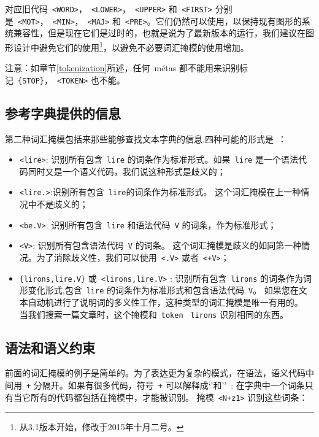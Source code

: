 \noindent  对应旧代码\ \verb+<WORD>+，\ \verb+<LOWER>+，\ \verb+<UPPER>+ 和\ \verb+<FIRST>+ 分别是\ \verb+<MOT>+，\ \verb+<MIN>+，\ \verb+<MAJ>+ 和\ \verb+<PRE>+。它们仍然可以使用，以保持现有图形的系统兼容性，但是现在它们是过时的，也就是说为了最新版本的运行，我们建议在图形设计中避免它们的使用\footnote{从3.1版本开始，修改于2015年十月二号。}，以避免不必要词汇掩模的使用增加。

\bigskip
\noindent 注意：如章节\ref{tokenization}所述，任何\ métas 都不能用来识别标记\ \verb+{STOP}+，\ \verb+<TOKEN>+ 也不能。

\subsection{参考字典提供的信息}

第二种词汇掩模包括来那些能够查找文本字典的信息.四种可能的形式是~：
\bigskip
\begin{itemize}
\item \verb+<lire>+: 识别所有包含\ \verb+lire+ 的词条作为标准形式。如果\  \verb+lire+ 是一个语法代码同时又是一个语义代码，我们说这种形式是歧义的；
  \item \verb+<lire.>+:识别所有包含\ \verb+lire+的词条作为标准形式。 这个词汇掩模在上一种情况中不是歧义的；
  \item \verb+<be.V>+: 识别所有包含\ \verb+lire+ 和语法代码\ \verb+V+ 的词条，作为标准形式；
  \item \verb+<V>+: 识别所有包含语法代码\ \verb+V+ 的词条。 这个词汇掩模是歧义的如同第一种情况。为了消除歧义性，我们可以使用\ \verb+<.V>+ 或者\ \verb$<+V>$；
\item \verb+{lirons,lire.V}+ 或\ \verb+<lirons,lire.V>+ : 识别所有包含\ \verb+lirons+ 的词条作为词形变化形式,包含\ \verb+lire+ 的词条作为标准形式和包含语法代码\ \verb+V+。 如果您在文本自动机进行了说明词的多义性工作，这种类型的词汇掩模是唯一有用的。 当我们搜索一篇文章时，这个掩模和\ \verb+token+ \ \verb+lirons+ 识别相同的东西。
\end{itemize}

\subsection{语法和语义约束}

 前面的词汇掩模的例子是简单的。为了表达更为复杂的模式，在语法，语义代码中间用\ \verb$+$ 分隔开。如果有很多代码，符号\ \verb$+$ 可以解释成`'和''~: 在字典中一个词条只有当它所有的代码都包括在掩模中，才能被识别。
  掩模\ \verb$<N+z1>$ 识别这些词条：

